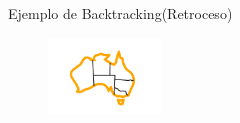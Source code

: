     \begin{frame}{Ejemplo de Backtracking(Retroceso) }
        \begin{figure}\includegraphics[width =30mm]{14img-cap5.png}\end{figure}
    \end{frame}